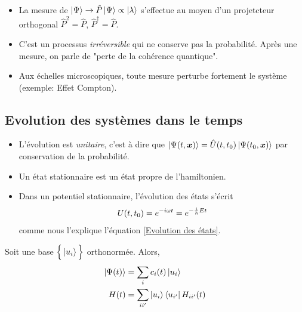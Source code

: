 \documentclass[../notesdecours.tex]{subfiles}
\begin{document}
\begin{itemize}
\item La mesure de $\ket{\Psi} \rightarrow \hat{P}\ket{\Psi} \propto \ket{\lambda}$ s'effectue au moyen d'un projetcteur orthogonal $\hat{P}^2 = \hat{P}$, $\hat{P}^\dagger = \hat{P}$.
\item C'est un processus \textit{irréversible} qui ne conserve pas la probabilité. Après une mesure, on parle de "perte de la cohérence quantique".
\item Aux échelles microscopiques, toute mesure perturbe fortement le système (exemple: Effet Compton). 
\end{itemize}

\subsection{Evolution des systèmes dans le temps}
\label{Postulat 5}
\begin{center}
\end{center}
\begin{itemize}
\item L'évolution est \textit{unitaire}, c'est à dire que $\ket{\Psi (t,\bm{x})} = \hat{U} (t,t_0)\ket{\Psi (t_0,\bm{x})}$ par conservation de la probabilité.
\item Un état stationnaire est un état propre de l'hamiltonien. 
\item Dans un potentiel stationnaire, l'évolution des états s'écrit
\begin{equation}
	U(t,t_0) = e^{-i\omega t} = e^{-\frac{i}{\hbar}Et}
\end{equation}
comme nous l'explique l'équation \eqref{Evolution des états}.
\end{itemize}
Soit une base $\Big\{\ket{u_i}\Big\}$ orthonormée. Alors,
\begin{align}
\ket{\Psi(t)} &= \sum_i c_i(t)\ket{u_i}\\
H(t) &= \sum_{i i'} \ket{u_i}\bra{u_{i'}} H_{ii'} (t)
\end{align}
\end{document}
